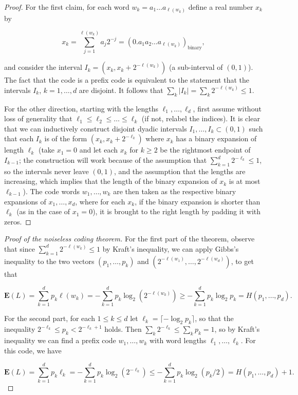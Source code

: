 \documentclass[11pt]{report}
\theoremstyle{plain}
\theoremstyle{definition}
\begin{document}
\begin{proof}
For the first claim, for each word $w_k=a_1\ldots a_{\ell(w_k)}$ define a real number $x_k$ by

\[
x_k = \sum_{j=1}^{\ell(w_k)} a_j 2^{-j} = (0.a_1a_2\ldots a_{\ell(w_k)})_{\textrm{binary}},
\]

and consider the interval $I_k = (x_k,x_k+2^{-\ell(w_k)})$ (a sub-interval of $(0,1)$). The fact that the code is a prefix code is equivalent to the statement that the intervals $I_k$, $k=1,\ldots,d$ are disjoint. It follows that $\sum_k |I_k| = \sum_k 2^{-\ell(w_k)} \le 1$.

For the other direction, starting with the lengths $\ell_1,\ldots,\ell_d$, first assume without loss of generality that $\ell_1\le \ell_2\le \ldots \le \ell_k$ (if not, relabel the indices). It is clear that we can inductively construct disjoint dyadic intervals $I_1,\ldots,I_k \subset (0,1)$ such that each $I_k$ is of the form $(x_k,x_k+2^{-\ell_k})$ where $x_k$ has a binary expansion of length $\ell_k$ (take $x_1=0$ and let each $x_k$ for $k\ge 2$ be the rightmost endpoint of $I_{k-1}$; the construction will work because of the assumption that $\sum_{k=1}^d 2^{-\ell_k} \le 1$, so the intervals never leave $(0,1)$, and the assumption that the lengths are increasing, which implies that the length of the binary expansion of $x_k$ is at most $\ell_{k-1}$). The code words $w_1,\ldots,w_k$ are then taken as the respective binary expansions of $x_1,\ldots,x_d$, where for each $x_k$, if the binary expansion is shorter than $\ell_k$ (as in the case of $x_1=0$), it is brought to the right length by padding it with zeros.
\end{proof}

\begin{proof}[Proof of the noiseless coding theorem]
For the first part of the theorem, observe that since $\sum_{k=1}^d 2^{-\ell(w_k)}\le 1$ by Kraft's inequality, we can apply Gibbs's inequality to the two vectors $(p_1,\ldots,p_k)$ and $(2^{-\ell(w_1)}, \ldots, 2^{-\ell(w_d)})$, to get that

\[
\mathbf{E}(L) = \sum_{k=1}^d p_k \ell(w_k) = -\sum_{k=1}^d p_k \log_2 \left(2^{-\ell(w_k)}\right) \ge -\sum_{k=1}^d p_k \log_2 p_k = H(p_1,\ldots,p_d).
\]

For the second part, for each $1\le k\le d$ let $\ell_k = \lceil -\log_2 p_k\rceil$, so that the inequality $2^{-\ell_k} \le p_k < 2^{-\ell_k+1}$ holds. Then $\sum_k 2^{-\ell_k} \le \sum_k p_k = 1$, so by Kraft's inequality we can find a prefix code $w_1,\ldots,w_k$ with word lengths $\ell_1,\ldots,\ell_k$. For this code, we have

\[
\mathbf{E}(L) = \sum_{k=1}^d p_k \ell_k = -\sum_{k=1}^d p_k \log_2\left(2^{-\ell_k}\right)
\le -\sum_{k=1}^d p_k \log_2 (p_k/2) = H(p_1,\ldots,p_d) + 1.
\]

\end{proof}
\end{document}

